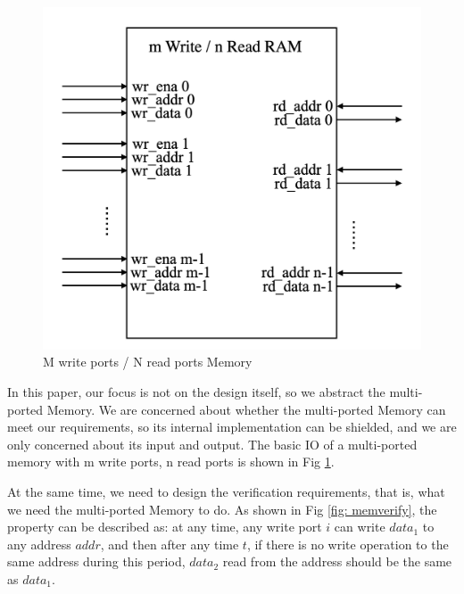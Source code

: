 \documentclass[conference]{IEEEtran}
\theoremstyle{definition}
\begin{document}
\begin{figure}[!htbp]
    \begin{center}
    \includegraphics[width=0.9\linewidth]{pics/mpmemoryio.png}
    \caption{M write ports / N read ports Memory}
    \label{fig: mpmemoryio}
    \end{center}
\end{figure}

In this paper, our focus is not on the design itself, so we abstract the multi-ported Memory. We are concerned about whether the multi-ported Memory can meet our requirements, so its internal implementation can be shielded, and we are only concerned about its input and output. The basic IO of a multi-ported memory with m write ports, n read ports is shown in Fig \ref{fig: mpmemoryio}.

At the same time, we need to design the verification requirements, that is, what we need the multi-ported Memory to do. As shown in Fig \ref{fig: memverify}, the property can be described as: at any time, any write port $i$ can write $data_1$ to any address $addr$, and then after any time $t$, if there is no write operation to the same address during this period, $data_2$ read from the address should be the same as $data_1$.
\end{document}
